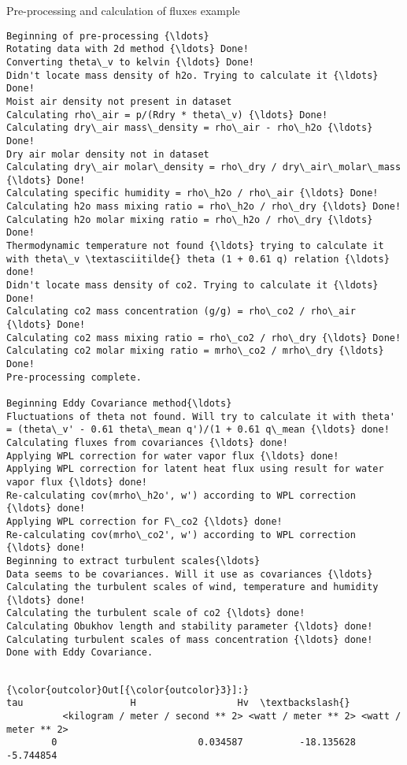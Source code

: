 \documentclass[11pt]{article}
\begin{document}
\begin{block}{Pre-processing and calculation of fluxes example}
    \begin{Verbatim}[commandchars=\\\{\}]
Beginning of pre-processing {\ldots}
Rotating data with 2d method {\ldots} Done!
Converting theta\_v to kelvin {\ldots} Done!
Didn't locate mass density of h2o. Trying to calculate it {\ldots} Done!
Moist air density not present in dataset
Calculating rho\_air = p/(Rdry * theta\_v) {\ldots} Done!
Calculating dry\_air mass\_density = rho\_air - rho\_h2o {\ldots} Done!
Dry air molar density not in dataset
Calculating dry\_air molar\_density = rho\_dry / dry\_air\_molar\_mass {\ldots} Done!
Calculating specific humidity = rho\_h2o / rho\_air {\ldots} Done!
Calculating h2o mass mixing ratio = rho\_h2o / rho\_dry {\ldots} Done!
Calculating h2o molar mixing ratio = rho\_h2o / rho\_dry {\ldots} Done!
Thermodynamic temperature not found {\ldots} trying to calculate it with theta\_v \textasciitilde{} theta (1 + 0.61 q) relation {\ldots} done!
Didn't locate mass density of co2. Trying to calculate it {\ldots} Done!
Calculating co2 mass concentration (g/g) = rho\_co2 / rho\_air {\ldots} Done!
Calculating co2 mass mixing ratio = rho\_co2 / rho\_dry {\ldots} Done!
Calculating co2 molar mixing ratio = mrho\_co2 / mrho\_dry {\ldots} Done!
Pre-processing complete.

Beginning Eddy Covariance method{\ldots}
Fluctuations of theta not found. Will try to calculate it with theta' = (theta\_v' - 0.61 theta\_mean q')/(1 + 0.61 q\_mean {\ldots} done!
Calculating fluxes from covariances {\ldots} done!
Applying WPL correction for water vapor flux {\ldots} done!
Applying WPL correction for latent heat flux using result for water vapor flux {\ldots} done!
Re-calculating cov(mrho\_h2o', w') according to WPL correction {\ldots} done!
Applying WPL correction for F\_co2 {\ldots} done!
Re-calculating cov(mrho\_co2', w') according to WPL correction {\ldots} done!
Beginning to extract turbulent scales{\ldots}
Data seems to be covariances. Will it use as covariances {\ldots}
Calculating the turbulent scales of wind, temperature and humidity {\ldots} done!
Calculating the turbulent scale of co2 {\ldots} done!
Calculating Obukhov length and stability parameter {\ldots} done!
Calculating turbulent scales of mass concentration {\ldots} done!
Done with Eddy Covariance.


    \end{Verbatim}

\begin{Verbatim}[commandchars=\\\{\}]
{\color{outcolor}Out[{\color{outcolor}3}]:}                                tau                   H                  Hv  \textbackslash{}
          <kilogram / meter / second ** 2> <watt / meter ** 2> <watt / meter ** 2>   
        0                         0.034587          -18.135628           -5.744854   
        

\end{Verbatim}
\end{block}
\end{document}
